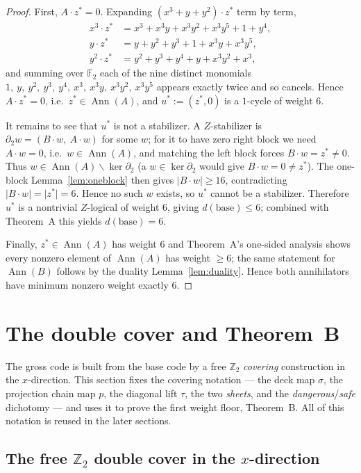 \documentclass[11pt]{article}
\newcommand{\Z}{\mathbb{Z}}
\newcommand{\F}[1]{\mathbb{F}_{#1}}
\newcommand{\wt}[1]{\lvert #1\rvert}
\DeclareMathOperator{\Ann}{Ann}
\theoremstyle{plain}
\theoremstyle{definition}
\theoremstyle{remark}
\begin{document}
\begin{proof}
First, $A\cdot z^\ast=0$. Expanding $(x^3+y+y^2)\cdot z^\ast$ term by term,
\[
\begin{aligned}
  x^3\cdot z^\ast &= x^3 + x^3y + x^3y^2 + x^3y^5 + 1 + y^4,\\
  y\cdot z^\ast   &= y + y^2 + y^3 + 1 + x^3y + x^3y^5,\\
  y^2\cdot z^\ast &= y^2 + y^3 + y^4 + y + x^3y^2 + x^3,
\end{aligned}
\]
and summing over $\F2$ each of the nine distinct monomials
$1,\ y,\ y^2,\ y^3,\ y^4,\ x^3,\ x^3y,\ x^3y^2,\ x^3y^5$ appears exactly twice and so cancels.
Hence $A\cdot z^\ast=0$, i.e.\ $z^\ast\in\Ann(A)$, and $u^\ast:=(z^\ast,0)$ is a $1$-cycle of
weight $6$.

It remains to see that $u^\ast$ is not a stabilizer. A $Z$-stabilizer is
$\partial_2 w=(B\cdot w,\ A\cdot w)$ for some $w$; for it to have zero right block we need
$A\cdot w=0$, i.e.\ $w\in\Ann(A)$, and matching the left block forces $B\cdot w=z^\ast\ne0$.
Thus $w\in\Ann(A)\smallsetminus\ker\partial_2$ (a $w\in\ker\partial_2$ would give
$B\cdot w=0\ne z^\ast$). The one-block Lemma~\ref{lem:oneblock} then gives
$\wt{B\cdot w}\ge16$, contradicting $\wt{B\cdot w}=\wt{z^\ast}=6$. Hence no such $w$ exists, so $u^\ast$
cannot be a stabilizer. Therefore $u^\ast$ is a nontrivial $Z$-logical of weight $6$, giving
$d(\mathrm{base})\le6$; combined with Theorem~A this yields $d(\mathrm{base})=6$.

Finally, $z^\ast\in\Ann(A)$ has weight $6$ and Theorem~A's one-sided analysis shows every
nonzero element of $\Ann(A)$ has weight $\ge6$; the same statement for $\Ann(B)$ follows by
the duality Lemma~\ref{lem:duality}. Hence both annihilators have minimum nonzero weight
exactly $6$.
\end{proof}
\section{The double cover and Theorem~B}\label{sec:thmB}

The gross code is built from the base code by a free $\Z_2$ \emph{covering} construction
in the $x$-direction. This section fixes the covering notation --- the deck map $\sigma$,
the projection chain map $p$, the diagonal lift $\tau$, the two \emph{sheets}, and the
\emph{dangerous}/\emph{safe} dichotomy --- and uses it to prove the first weight floor,
Theorem~B. All of this notation is reused in the later sections.

\subsection{The free \texorpdfstring{$\Z_2$}{Z2} double cover in the \texorpdfstring{$x$}{x}-direction}
\end{document}
